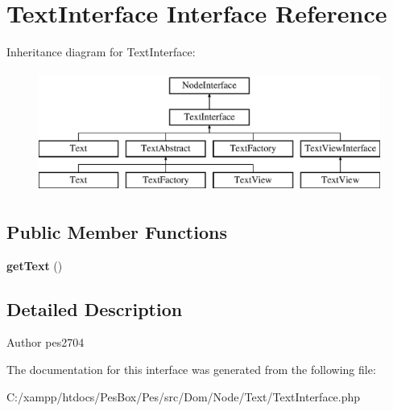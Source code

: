 \hypertarget{interface_pes_1_1_dom_1_1_node_1_1_text_1_1_text_interface}{}\section{Text\+Interface Interface Reference}
\label{interface_pes_1_1_dom_1_1_node_1_1_text_1_1_text_interface}
Inheritance diagram for Text\+Interface\+:\begin{figure}[H]
\begin{center}
\leavevmode
\includegraphics[height=4.000000cm]{interface_pes_1_1_dom_1_1_node_1_1_text_1_1_text_interface}
\end{center}
\end{figure}
\subsection*{Public Member Functions}
\begin{DoxyCompactItemize}
\item 
\mbox{\label{interface_pes_1_1_dom_1_1_node_1_1_text_1_1_text_interface_a8a2999b1d846c0a7bc77187e28facd99}} 
{\bfseries get\+Text} ()
\end{DoxyCompactItemize}


\subsection{Detailed Description}
\begin{DoxyAuthor}{Author}
pes2704 
\end{DoxyAuthor}


The documentation for this interface was generated from the following file\+:\begin{DoxyCompactItemize}
\item 
C\+:/xampp/htdocs/\+Pes\+Box/\+Pes/src/\+Dom/\+Node/\+Text/Text\+Interface.\+php\end{DoxyCompactItemize}

